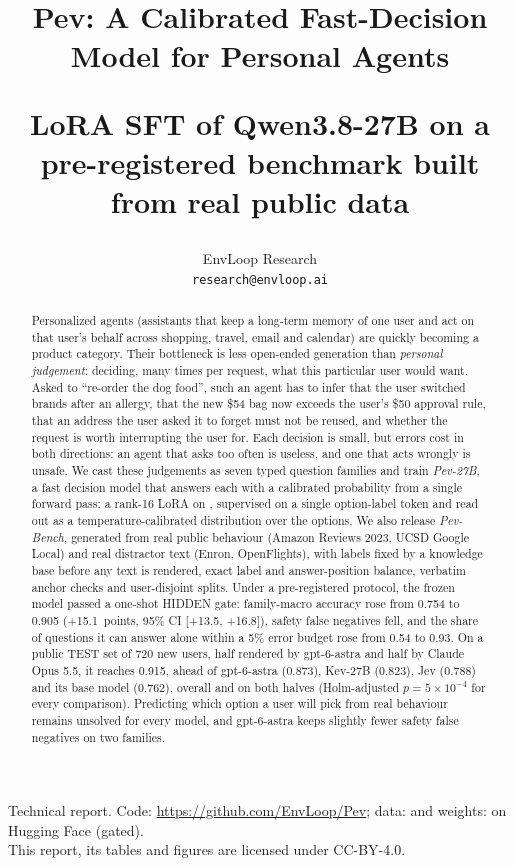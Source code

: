 \documentclass{article}
\title{Pev: A Calibrated Fast-Decision Model for Personal Agents\\[6pt]
  {\normalsize\mdseries LoRA SFT of Qwen3.8-27B on a pre-registered benchmark built from real public data\par}}
\author{%
  EnvLoop Research\\
  \texttt{research@envloop.ai}
}
\date{}
\newcommand{\code}[1]{\texttt{\detokenize{#1}}}
\begin{document}
\maketitle

\begin{abstract}
Personalized agents (assistants that keep a long-term memory of one user and act on that user's behalf across
shopping, travel, email and calendar) are quickly becoming a product category. Their bottleneck is less open-ended
generation than \emph{personal judgement}: deciding, many times per request, what this particular user would want.
Asked to ``re-order the dog food'', such an agent has to infer that the user switched brands after an allergy, that
the new \$54 bag now exceeds the user's \$50 approval rule, that an address the user asked it to forget must not be
reused, and whether the request is worth interrupting the user for. Each decision is small, but errors cost in both
directions: an agent that asks too often is useless, and one that acts wrongly is unsafe. We cast these judgements as
seven typed question families and train \emph{Pev-27B}, a fast decision model that answers each with a
calibrated probability from a single forward pass: a rank-16 LoRA on \code{Qwen/Qwen3.8-27B}, supervised on a single
option-label token and read out as a temperature-calibrated distribution over the options. We also release
\emph{Pev-Bench}, generated from real public behaviour (Amazon Reviews 2023, UCSD Google Local) and real
distractor text (Enron, OpenFlights), with labels fixed by a knowledge base before any text is rendered, exact label
and answer-position balance, verbatim anchor checks and user-disjoint splits.
Under a pre-registered protocol, the frozen model passed a one-shot HIDDEN gate: family-macro accuracy rose
from 0.754 to 0.905 (+15.1~points, 95\% CI [+13.5, +16.8]), safety false negatives fell, and the share of questions it
can answer alone within a 5\% error budget rose from 0.54 to 0.93. On a public TEST set of 720 new users, half rendered
by gpt-6-astra and half by Claude Opus 5.5, it reaches 0.915, ahead of gpt-6-astra (0.873), Kev-27B (0.823), Jev (0.788)
and its base model (0.762), overall and on both halves (Holm-adjusted $p = 5 \times 10^{-4}$ for every comparison).
Predicting which option a user will pick from real behaviour remains unsolved for every model, and gpt-6-astra keeps
slightly fewer safety false negatives on two families.
\end{abstract}

\begin{center}
\small
Technical report. Code: \url{https://github.com/EnvLoop/Pev};
data: \code{EnvLoop/Pev-Bench} and weights: \code{EnvLoop/Pev-27B-LoRA} on Hugging Face
(gated).\\
This report, its tables and figures are licensed under CC-BY-4.0.
\end{center}
\end{document}

